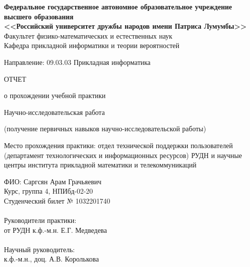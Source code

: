 \begin{titlepage}
  
  \begin{center}
    \textbf{%
      Федеральное государственное автономное образовательное
      учреждение высшего образования\\
      <<Российский университет дружбы народов имени Патриса Лумумбы>>}\\[5mm]
    Факультет физико-математических и естественных наук \\[2mm]
    Кафедра прикладной информатики и теории вероятностей

    \vfill

    
    
    \vfill

    Направление: 09.03.03 Прикладная информатика

    \vfill

    ОТЧЕТ

    \bigskip
    
    о прохождении учебной практики

    Научно-исследовательская работа
    
    (получение первичных навыков научно-исследовательской работы)

    \medskip
    
    Место прохождения практики: отдел технической поддержки
    пользователей (департамент технологических и информационных
    ресурсов) РУДН и научные центры института прикладной математики
    и телекоммуникаций
   
  \end{center}

\vfill

  \begin{minipage}{.45\textwidth}
    ФИО: Саргсян Арам Грачьяевич\\
    Курс, группа 4, НПИбд-02-20\\
    Студенческий билет № 1032201740 \\ \\
    Руководители практики: \\
    от РУДН к.ф.-м.н. Е.Г. Медведева \\ \\
    
    Научный руководитель: \\
    к.ф.-м.н., доц. А.В. Королькова \\ \\


\end{minipage}
\end{titlepage}
